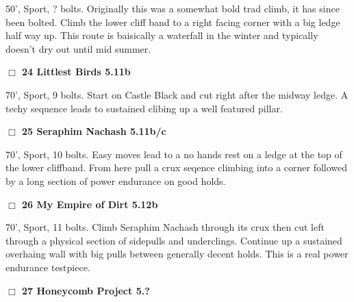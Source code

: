 \begin{multicols}{2}
\begin{adjustwidth}{1.3em}{}
50', Sport, ? bolts. Originally this was a somewhat bold trad climb, it has since been bolted. Climb the lower cliff band to a right facing corner with a big ledge half way up. This route is baisically a waterfall in the winter and typically doesn't dry out until mid summer.
\end{adjustwidth}




\needspace{2em}
\label{rt:Littlest Birds}
\colorbox{RoyalBlue!20}{
\parbox{0.95\linewidth}{
\hspace{-1ex}\textbf{$\Box$
24 Littlest Birds 5.11b  
}}}
\begin{adjustwidth}{1.3em}{}			

70', Sport, 9 bolts. Start on Castle Black and cut right after the midway ledge. A techy sequence leads to sustained clibing up a well featured pillar.
\end{adjustwidth}




\needspace{2em}
\label{rt:Seraphim Nachash}
\colorbox{RoyalBlue!20}{
\parbox{0.95\linewidth}{
\hspace{-1ex}\textbf{$\Box$
25 Seraphim Nachash 5.11b/c  
}}}
\begin{adjustwidth}{1.3em}{}			

70', Sport, 10 bolts. Easy moves lead to a no hands rest on a ledge at the top of the lower cliffband. From here pull a crux seqence climbing into a corner followed by a long section of power endurance on good holds.
\end{adjustwidth}




\needspace{2em}
\label{rt:My Empire of Dirt}
\colorbox{Goldenrod!20}{
\parbox{0.95\linewidth}{
\hspace{-1ex}\textbf{$\Box$
26 My Empire of Dirt 5.12b  
}}}
\begin{adjustwidth}{1.3em}{}			

70', Sport, 11 bolts. Climb Seraphim Nachash through its crux then cut left through a physical section of sidepulls and underclings. Continue up a sustained overhaing wall with big pulls between generally decent holds. This is a real power endurance testpiece.
\end{adjustwidth}




\needspace{2em}
\label{rt:Honeycomb Project}
\colorbox{black!20}{
\parbox{0.95\linewidth}{
\hspace{-1ex}\textbf{$\Box$
27 Honeycomb Project 5.?  
}}}
\begin{adjustwidth}{1.3em}{}			


\end{adjustwidth}
\end{multicols}
